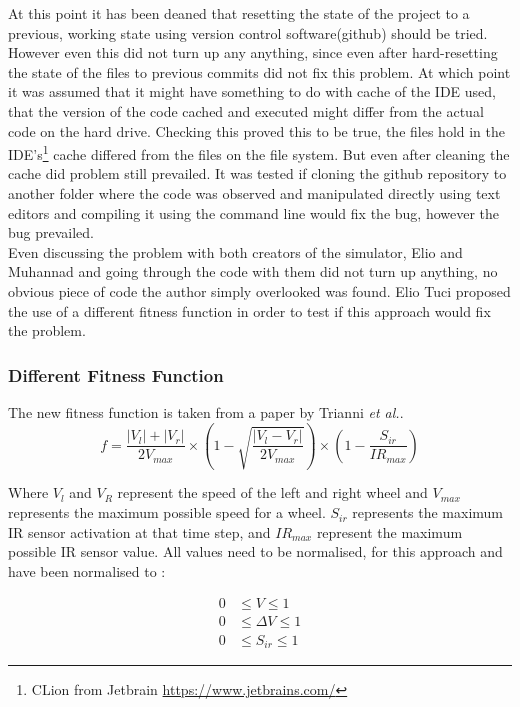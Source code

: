 At this point it has been deaned that resetting the state of the project to a previous, working state using version control software(github) should be tried.
However even this did not turn up any anything, since even after hard-resetting the state of the files to previous commits did not fix this problem.
At which point it was assumed that it might have something to do with cache of the IDE used, that the version of the code cached and executed might differ from the actual code on the hard drive. 
Checking this proved this to be true, the files hold in the  IDE's\footnote{CLion from Jetbrain \url{https://www.jetbrains.com/}}  cache differed from the files on the file system.
But even after cleaning the cache did problem still prevailed. It was tested if cloning the github repository to another folder where the code was observed and manipulated directly using text editors and compiling it using the command line would fix the bug, however the bug prevailed. \\

Even discussing the problem with both creators of the simulator, Elio and Muhannad and going through the code with them did not turn up anything, no obvious piece of code the author simply overlooked was found.
Elio Tuci proposed the use of a different fitness function in order to test if this approach would fix the problem.\\

\subsubsection{Different Fitness Function}
The new fitness function is taken from a paper by Trianni \textit{et al.}\cite{Trianni}.\\

\begin{equation}
f = \frac{|V_l| + |V_r|}{2V_{max}} \times ( 1 - \sqrt{\frac{|V_l - V_r|}{2V_{max}}}) \times (1 - \frac{S_{ir}}{IR_{max}})
\end{equation}

Where $V_l$ and $V_R$ represent the speed of the left and right wheel and $V_{max}$ represents the maximum possible speed for a wheel.
$S_{ir}$ represents the maximum IR sensor activation at that time step, and $IR_{max}$ represent the maximum possible IR sensor value. 
All values need to be normalised, for this approach and have been normalised to :

\begin{align*}
	0  &\leq V \leq 1 \\  
	0  &\leq \Delta V  \leq 1 \\
	0  &\leq S_{ir} \leq 1
\end{align*}

